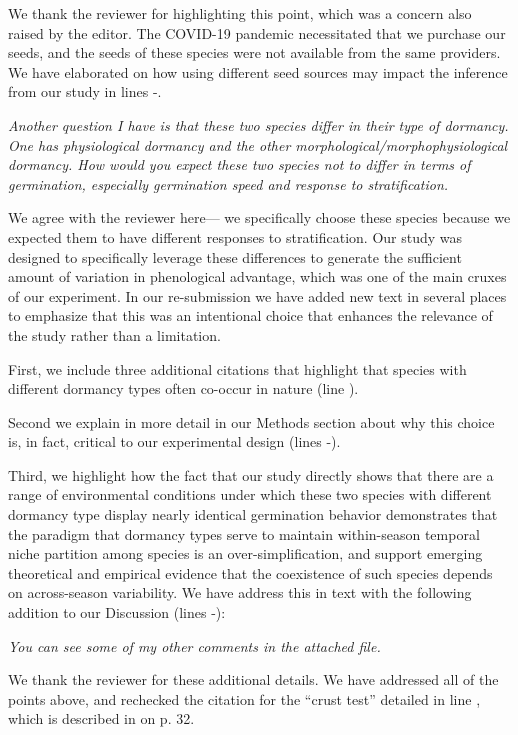\documentclass[11pt]{article}
\begin{document}
We thank the reviewer for highlighting this point, which was a concern also raised by the editor. The COVID-19 pandemic necessitated that we purchase our seeds, and the seeds of these species were not available from the same providers. We have elaborated on how using different seed sources may impact the inference from our study in lines -.

\emph{Another question I have is that these two species differ in their type of dormancy. One has physiological dormancy and the other morphological/morphophysiological dormancy. How would you expect these two species not to differ in terms of germination, especially germination speed and response to stratification.}

We agree with the reviewer here--- we specifically choose these species because we expected them to have different responses to stratification. 
Our study was designed to specifically leverage these differences to generate the sufficient amount of variation in phenological advantage, which was one of the main cruxes of our experiment. In our re-submission we have added new text in several places to emphasize that this was an intentional choice that enhances the relevance of the study rather than a limitation.

First, we include three additional citations that highlight that species with different dormancy types often co-occur in nature (line ).

Second we explain in more detail in our Methods section about why this choice is, in fact, critical to our experimental design (lines -).

Third, we highlight how the fact that our study directly shows that there are a range of environmental conditions under which these two species with different dormancy type display nearly identical germination behavior demonstrates that the paradigm that dormancy types serve to maintain within-season temporal niche partition among species is an over-simplification, and support emerging theoretical and empirical evidence that the coexistence of such species depends on across-season variability. We have address this in text with the following addition to our Discussion (lines -):


\emph{You can see some of my other comments in the attached file.}

We thank the reviewer for these additional details. We have addressed all of the points above, and rechecked the citation for the ``crust test'' detailed in line , which is described in \citet{Baskin2014} on p. 32.
\end{document}
